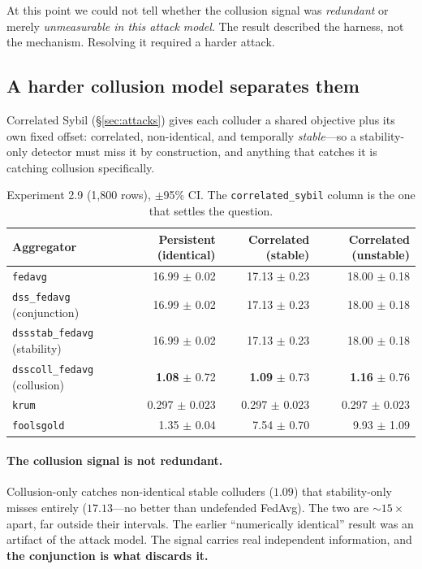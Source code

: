 \documentclass[11pt,a4paper]{article}
\newcommand{\code}[1]{\texttt{\small #1}}
\newcommand{\best}[1]{\textbf{#1}}
\newcommand{\bad}[1]{\textcolor{red!70!black}{#1}}
\begin{document}
At this point we could not tell whether the collusion signal was
\emph{redundant} or merely \emph{unmeasurable in this attack model}. The
result described the harness, not the mechanism. Resolving it required a
harder attack.

\subsection{A harder collusion model separates them}
\label{sec:correlated}

Correlated Sybil (\S\ref{sec:attacks}) gives each colluder a shared
objective plus its own fixed offset: correlated, non-identical, and
temporally \emph{stable}---so a stability-only detector must miss it by
construction, and anything that catches it is catching collusion
specifically.

\begin{table}[htbp]
\centering
\small
\caption{Experiment 2.9 (1{,}800 rows), $\pm$95\% CI. The
\code{correlated\_sybil} column is the one that settles the question.}
\label{tab:ablation2}
\begin{tabular}{lrrr}
\toprule
\textbf{Aggregator} & \textbf{Persistent (identical)} & \textbf{Correlated (stable)} & \textbf{Correlated (unstable)} \\
\midrule
\code{fedavg}                        & 16.99 $\pm$ 0.02 & 17.13 $\pm$ 0.23 & 18.00 $\pm$ 0.18 \\
\code{dss\_fedavg} (conjunction)     & 16.99 $\pm$ 0.02 & 17.13 $\pm$ 0.23 & 18.00 $\pm$ 0.18 \\
\code{dssstab\_fedavg} (stability)   & 16.99 $\pm$ 0.02 & 17.13 $\pm$ 0.23 & 18.00 $\pm$ 0.18 \\
\code{dsscoll\_fedavg} (collusion)   & \best{1.08} $\pm$ 0.72 & \best{1.09} $\pm$ 0.73 & \best{1.16} $\pm$ 0.76 \\
\code{krum}                          & 0.297 $\pm$ 0.023 & 0.297 $\pm$ 0.023 & 0.297 $\pm$ 0.023 \\
\code{foolsgold}                     & 1.35 $\pm$ 0.04 & \bad{7.54} $\pm$ 0.70 & \bad{9.93} $\pm$ 1.09 \\
\bottomrule
\end{tabular}
\end{table}

\paragraph{The collusion signal is not redundant.} Collusion-only catches
non-identical stable colluders ($1.09$) that stability-only misses
entirely ($17.13$---no better than undefended FedAvg). The two are
${\sim}15\times$ apart, far outside their intervals. The earlier
``numerically identical'' result was an artifact of the attack model. The
signal carries real independent information, and \textbf{the conjunction
is what discards it.}
\end{document}
